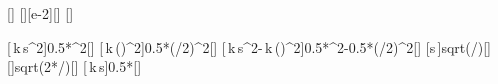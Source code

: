 [\Npm]
[\cm][e-2][\meter]
[\kg]

[\,k\,s^2]{0.5*\kKX*\sKX^2}[\joule]
[\,k\,\left(\right)^2]{0.5*\kKX*(\sKX/2)^2}[\joule]
[\,k\,s^2-\,k\,\left(\right)^2]{0.5*\kKX*\sKX^2-0.5*\kKX*(\sKX/2)^2}[\joule]
[s\,]{\sKX*sqrt(\kKX/\mKX)}[\mps]
[]{sqrt(2*\EkbX/\mKX)}[\mps]
[\,k\,s]{0.5*\kKX*\sKX}[\newton]
